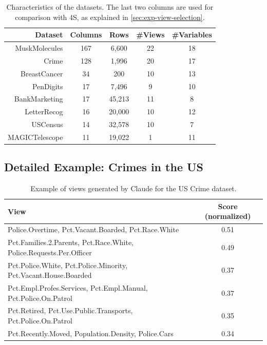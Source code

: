 \begin{table}
    \centering
    \small
    \begin{tabular}{r c c c c} 
        \hline
        Dataset & Columns & Rows & \#Views & \#Variables\\
        \hline
        MuskMolecules & 167 & 6,600 & 22 & 18\\
        Crime & 128 & 1,996 & 20 & 17\\
        BreastCancer & 34 & 200 & 10 & 13\\
        PenDigits & 17 & 7,496 & 9 & 10\\
        BankMarketing & 17 & 45,213 & 11& 8\\
        LetterRecog & 16 & 20,000 & 10 & 12\\
        USCensus & 14 & 32,578 & 10 & 7\\
        MAGICTelescope & 11 & 19,022 & 1 & 11\\
        \hline
    \end{tabular}
    \caption{Characteristics of the datasets. The last two columns are used for
    comparison with 4S, as explained in \ref{sec:exp-view-selection}.}
    \label{tab:datasets}
\end{table}

\subsection{Detailed Example: Crimes in the US}

\begin{table}[t]
  \centering
  \small
  \begin{tabulary}{\columnwidth}{L c}
    \hline
    View & Score (normalized)\\
    \hline
    Police.Overtime, Pct.Vacant.Boarded, Pct.Race.White & 0.51\\
    Pct.Families.2.Parents, Pct.Race.White, Police.Requests.Per.Officer & 0.49\\
    Pct.Police.White, Pct.Police.Minority, Pct.Vacant.House.Boarded& 0.37\\
    Pct.Empl.Profes.Services, Pct.Empl.Manual, Pct.Police.On.Patrol & 0.37\\
    Pct.Retired, Pct.Use.Public.Transports, Pct.Police.On.Patrol& 0.35 \\
    Pct.Recently.Moved, Population.Density, Police.Cars & 0.34 \\
    \hline
\end{tabulary}
    \caption{Example of views generated by Claude for the US Crime dataset.}
    \label{tab:crime_views}
\end{table}

